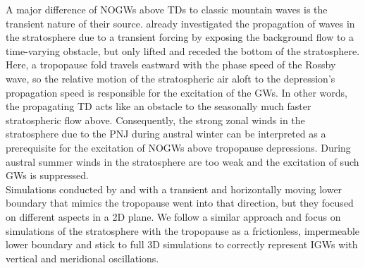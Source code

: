 A major difference of NOGWs above TDs to classic mountain waves is the transient nature of their source. \textcite{pfister_gravity_1993} already investigated the propagation of waves in the stratosphere due to a transient forcing by exposing the background flow to a time-varying obstacle, but only lifted and receded the bottom of the stratosphere. Here, a tropopause fold travels eastward with the phase speed of the Rossby wave, so the relative motion of the stratospheric air aloft to the depression's propagation speed is responsible for the excitation of the GWs. In other words, the propagating TD acts like an obstacle to the seasonally much faster stratospheric flow above. Consequently, the strong zonal winds in the stratosphere due to the PNJ during austral winter can be interpreted as a prerequisite for the excitation of NOGWs above tropopause depressions. During austral summer winds in the stratosphere are too weak and the excitation of such GWs is suppressed. \\
Simulations conducted by \textcite[]{prusa_propagation_1996} and \textcite[]{prusa_all-scale_2003} with a transient and horizontally moving lower boundary that mimics the tropopause went into that direction, but they focused on different aspects in a 2D plane. We follow a similar approach and focus on simulations of the stratosphere with the tropopause as a frictionless, impermeable lower boundary and stick to full 3D simulations to correctly represent IGWs with vertical and meridional oscillations. 


